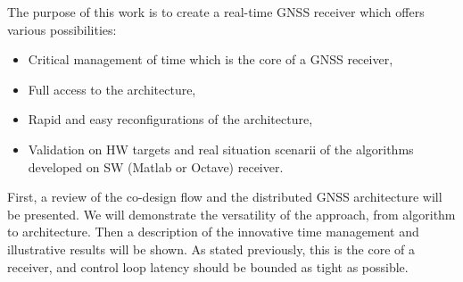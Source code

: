\documentclass[conference]{IEEEtran}
\begin{document}
The purpose of this work is to create a real-time GNSS receiver which offers various possibilities:
\begin{itemize}
\item Critical management of time which is the core of a GNSS receiver,
\item Full access to the architecture,
\item Rapid and easy reconfigurations of the architecture,
\item Validation on HW targets and real situation scenarii of the algorithms developed on SW (Matlab or Octave) receiver.
\end{itemize}
First, a review of the co-design flow and the distributed GNSS architecture will be presented. We will demonstrate the versatility of the approach, from algorithm to architecture. Then a description of the innovative time management and illustrative results will be shown. As stated previously, this is the core of a receiver, and control loop latency should be bounded as tight as possible.
\end{document}
